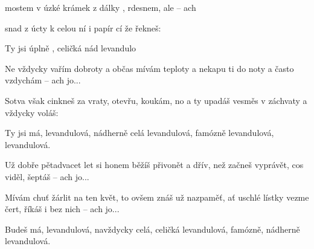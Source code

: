 
\zs

 mostem v úzké 
 krámek z dálky 
, rdesnem, 
ale  -- ach 

\ks
\zs

 snad z úcty k 
 celou 
 ní i papír 
cí že řekneš: 

\ks
\zr

Ty jsi   
úplně , celičká  
nád 
  levandulo

\kr
\zs

Ne vždycky vařím dobroty
a občas mívám teploty
a nekapu ti do noty
a často vzdychám -- ach jo...

\ks
\zs

Sotva však cinkneš za vraty,
otevřu, koukám, no a ty
upadáš vesměs v záchvaty
a vždycky voláš:

\ks
\zr

Ty jsi má, levandulová,
nádherně celá levandulová,
famózně levandulová,
levandulová.

\kr
\zs

Už dobře pětadvacet let
si honem běžíš přivonět
a dřív, než začneš vyprávět,
cos viděl, šeptáš -- ach jo...

\ks
\zs

Mívám chuť žárlit na ten květ,
to ovšem znáš už nazpaměť,
ať uschlé lístky vezme čert,
říkáš i bez nich -- ach jo...

\ks
\zr

Budeš má, levandulová,
navždycky celá, celičká
levandulová,
famózně, nádherně levandulová.

\kr
\kp

